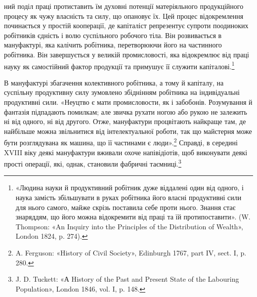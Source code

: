 \parcont{}  %
ний поділ праці протиставить їм духовні потенції матеріяльного
продукційного процесу як чужу власність та силу, що опановує
їх. Цей процес відокремлення починається у простій кооперації,
де капіталіст репрезентує супроти поодиноких робітників єдність
і волю суспільного робочого тіла. Він розвивається в мануфактурі,
яка калічить робітника, перетворюючи його на частинного
робітника. Він завершується у великій промисловості, яка відокремлює
від праці науку як самостійний фактор продукції та
примушує її служити капіталові.\footnote{
«Людина науки й продуктивний робітник дуже віддалені один від
одного, і наука замість збільшувати в руках робітника його власні продуктивні
сили для нього самого, майже скрізь поставила себе проти нього.
Знання стає знаряддям, що його можна відокремити від праці та їй протипоставити».
(W. Thompson: «An Inquiry into the Principles of the
Distribution of Wealth», London 1824, p. 274).
}

В мануфактурі збагачення колективного робітника, а тому
й капіталу, на суспільну продуктивну силу зумовлено збіднінням
робітника на індивідуальні продуктивні сили. «Неуцтво є
мати промисловости, як і забобонів. Розумування й фантазія
підпадають помилкам; але звичка рухати ногою або рукою не
залежить ні від одного, ні від другого. Отже, мануфактури процвітають
найкраще там, де найбільше можна звільнитися від
інтелектуальної роботи, так що майстерня може бути розглядувана
як машина, що її частинами є люди».\footnote{
A. Ferguson: «History of Civil Society», Edinburgh 1767,
part IV, sect. I, p. 280.
} Справді, в середині
XVIII віку деякі мануфактури вживали охоче напівідіотів,
щоб виконувати деякі прості операції, які, однак, становили
фабричні таємниці.\footnote{
J. D. Tuckett: «А History of the Past and Present State of
the Labouring Population», London 1846, vol. I, p. 148.
}

